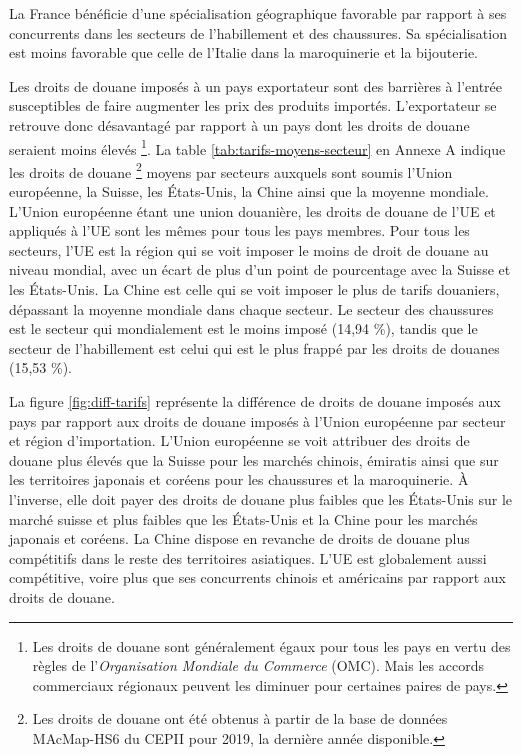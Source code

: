\documentclass[french,10pt,a4paper]{article}
\begin{document}
\bigskip

La France bénéficie d'une spécialisation géographique favorable par rapport à ses concurrents dans les secteurs de l'habillement et des chaussures. Sa spécialisation est moins favorable que celle de l'Italie dans la maroquinerie et la bijouterie.

% 
\begin{tcolorbox}[title=Encadré 1 : Droits de douane]
  \small
  Les droits de douane imposés à un pays exportateur sont des barrières à l'entrée susceptibles de faire augmenter les prix des produits importés. L'exportateur se retrouve donc désavantagé par rapport à un pays dont les droits de douane seraient moins élevés \footnote{Les droits de douane sont généralement égaux pour tous les pays en vertu des règles de l'\textit{Organisation Mondiale du Commerce} (OMC). Mais les accords commerciaux régionaux peuvent les diminuer pour certaines paires de pays.}. La table \ref{tab:tarifs-moyens-secteur} en Annexe A indique les droits de douane \footnote{Les droits de douane ont été obtenus à partir de la base de données MAcMap-HS6 du CEPII \citep{Guimbard2012} pour 2019, la dernière année disponible.} moyens par secteurs auxquels sont soumis l'Union européenne, la Suisse, les États-Unis, la Chine ainsi que la moyenne mondiale. L'Union européenne étant une union douanière, les droits de douane de l'UE et appliqués à l'UE sont les mêmes pour tous les pays membres. Pour tous les secteurs, l'UE est la région qui se voit imposer le moins de droit de douane au niveau mondial, avec un écart de plus d'un point de pourcentage avec la Suisse et les États-Unis. La Chine est celle qui se voit imposer le plus de tarifs douaniers, dépassant la moyenne mondiale dans chaque secteur. Le secteur des chaussures est le secteur qui mondialement est le moins imposé (14,94 \%), tandis que le secteur de l'habillement est celui qui est le plus frappé par les droits de douanes (15,53 \%).

  \medskip
  
  La figure \ref{fig:diff-tarifs} représente la différence de droits de douane imposés aux pays par rapport aux droits de douane imposés à l'Union européenne par secteur et région d'importation. L'Union européenne se voit attribuer des droits de douane plus élevés que la Suisse pour les marchés chinois, émiratis ainsi que sur les territoires japonais et coréens pour les chaussures et la maroquinerie. À l'inverse, elle doit payer des droits de douane plus faibles que les États-Unis sur le marché suisse et plus faibles que les États-Unis et la Chine pour les marchés japonais et coréens. La Chine dispose en revanche de droits de douane plus compétitifs dans le reste des territoires asiatiques. L'UE est globalement aussi compétitive, voire plus que ses concurrents chinois et américains par rapport aux droits de douane.


\end{tcolorbox}
\end{document}
